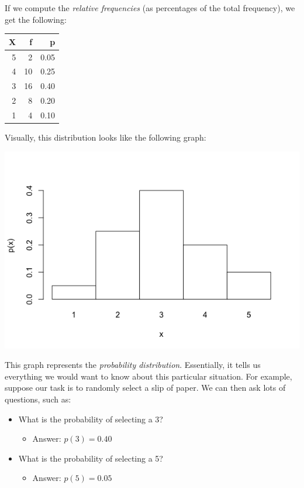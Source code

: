 \documentclass[11pt]{article}
\begin{document}
If we compute the \emph{relative frequencies} (as percentages of the total frequency), we get the following:

\begin{center}
\begin{tabular}{rrr}
X & f & p\\
\hline
5 & 2 & 0.05\\
4 & 10 & 0.25\\
3 & 16 & 0.40\\
2 & 8 & 0.20\\
1 & 4 & 0.10\\
\end{tabular}
\end{center}

Visually, this distribution looks like the following graph:

\includegraphics[width=.9\linewidth]{figures/week5/plot1.png}

This graph represents the \emph{probability distribution}.  Essentially, it tells us everything we would want to know about this particular situation.  For example, suppose our task is to randomly select a slip of paper.  We can then ask lots of questions, such as:

\begin{itemize}
\item What is the probability of selecting a 3?
\begin{itemize}
\item Answer: $p(3) = 0.40$
\end{itemize}
\item What is the probability of selecting a 5?
\begin{itemize}
\item Answer: $p(5) = 0.05$
\end{itemize}
\end{itemize}
\end{document}
